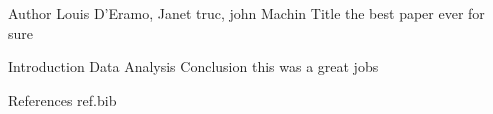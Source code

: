 Author Louis D'Eramo, Janet truc, john Machin
Title the best paper ever for sure

Introduction
Data
Analysis
Conclusion this was a great jobs


References 
ref.bib